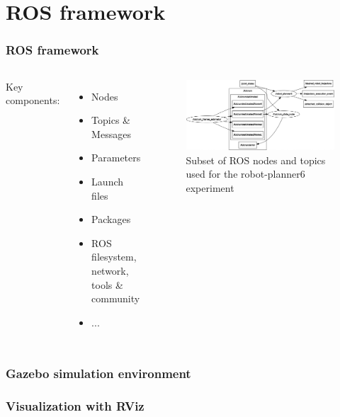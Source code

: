 \section{ROS framework}

\begin{frame}
\frametitle{ROS framework}
\begin{columns}
Key components:
\begin{itemize}
\item Nodes
\item Topics \& Messages
\item Parameters
\item Launch files
\item Packages
\item ROS filesystem, network, tools \& community
\item ...
\end{itemize}
\begin{center}
\begin{figure}[!htb]
\centering
\includegraphics[width=\textwidth]{../images/robot_planner6/topics-and-nodes.png}
\caption{Subset of ROS nodes and topics used for the robot-planner6 experiment}
\end{figure}
\end{center}
\end{columns}
\end{frame}

\begin{frame}
\frametitle{Gazebo simulation environment}
\end{frame}

\begin{frame}
\frametitle{Visualization with RViz}
\end{frame}

